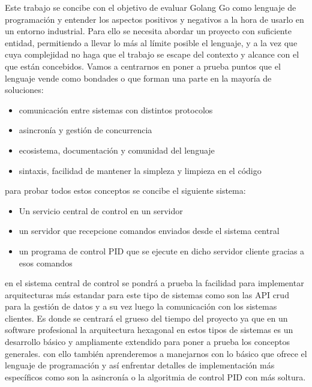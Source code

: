 
Este trabajo se concibe con el objetivo de evaluar Golang Go como lenguaje de programación y entender los aspectos positivos y negativos a la hora de usarlo en un entorno industrial. Para ello se necesita abordar un proyecto con suficiente entidad, permitiendo a llevar lo más al límite posible el lenguaje, y a la vez que cuya complejidad no haga que el trabajo se escape del contexto y alcance con el que están concebidos. Vamos a centrarnos en poner a prueba puntos que el lenguaje vende como bondades o que forman una parte en la mayoría de soluciones:

\begin{itemize}
	\item comunicación entre sistemas con distintos protocolos
	\item asincronía y gestión de concurrencia
	\item ecosistema, documentación y comunidad del lenguaje
	\item sintaxis, facilidad de mantener la simpleza y limpieza en el código
\end{itemize} 

para probar todos estos conceptos se concibe el siguiente sistema:

\begin{itemize}
	\item Un servicio central de control en un servidor
	\item un servidor que recepcione comandos enviados desde el sistema central
	\item un programa de control PID que se ejecute en dicho servidor cliente gracias a esos comandos
\end{itemize}




en el sistema central de control se pondrá a prueba la facilidad para implementar arquitecturas más estandar para este tipo de sistemas como son las API crud para la gestión de datos y a su vez luego la comunicación con los sistemas clientes. Es donde se centrará el grueso del tiempo del proyecto ya que en un software profesional la arquitectura hexagonal en estos tipos de sistemas es un desarrollo básico y ampliamente extendido para poner a prueba los conceptos generales. con ello también aprenderemos a manejarnos con lo básico que ofrece el lenguaje de programación y así enfrentar detalles de implementación más específicos como son la asincronía o la algoritmia de control PID con más soltura.


